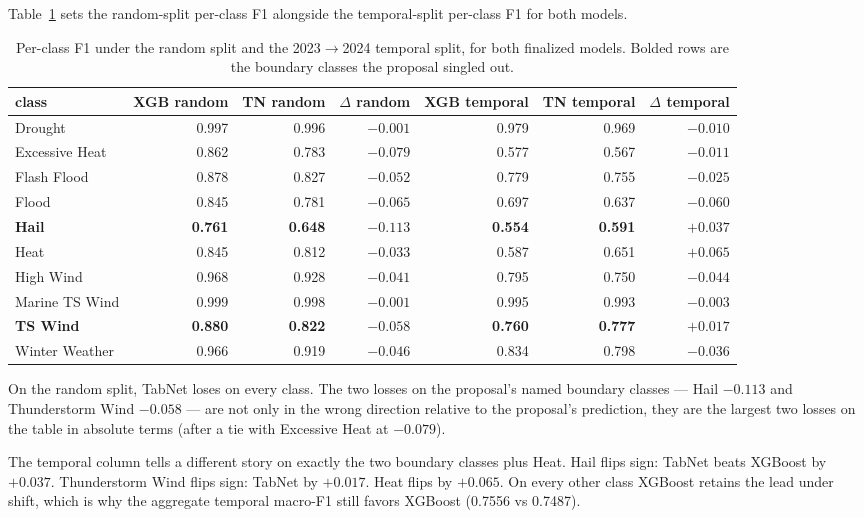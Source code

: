 \documentclass[11pt]{article}
\newcommand{\mF}{macro-F1}
\begin{document}
Table~\ref{tab:per-class} sets the random-split per-class F1
alongside the temporal-split per-class F1 for both models.

\begin{table}[h]
  \centering
  \scriptsize
  \caption{Per-class F1 under the random split and the
  2023$\rightarrow$2024 temporal split, for both finalized models.
  Bolded rows are the boundary classes the proposal singled out.}
  \label{tab:per-class}
  \begin{tabular}{lrrrrrr}
    \toprule
    class & XGB random & TN random & $\Delta$ random & XGB temporal & TN temporal & $\Delta$ temporal \\
    \midrule
    Drought           & 0.997 & 0.996 & $-0.001$ & 0.979 & 0.969 & $-0.010$ \\
    Excessive Heat    & 0.862 & 0.783 & $-0.079$ & 0.577 & 0.567 & $-0.011$ \\
    Flash Flood       & 0.878 & 0.827 & $-0.052$ & 0.779 & 0.755 & $-0.025$ \\
    Flood             & 0.845 & 0.781 & $-0.065$ & 0.697 & 0.637 & $-0.060$ \\
    \textbf{Hail}     & \textbf{0.761} & \textbf{0.648} & \textbf{$-0.113$} & \textbf{0.554} & \textbf{0.591} & \textbf{$+0.037$} \\
    Heat              & 0.845 & 0.812 & $-0.033$ & 0.587 & 0.651 & $+0.065$ \\
    High Wind         & 0.968 & 0.928 & $-0.041$ & 0.795 & 0.750 & $-0.044$ \\
    Marine TS Wind    & 0.999 & 0.998 & $-0.001$ & 0.995 & 0.993 & $-0.003$ \\
    \textbf{TS Wind}  & \textbf{0.880} & \textbf{0.822} & \textbf{$-0.058$} & \textbf{0.760} & \textbf{0.777} & \textbf{$+0.017$} \\
    Winter Weather    & 0.966 & 0.919 & $-0.046$ & 0.834 & 0.798 & $-0.036$ \\
    \bottomrule
  \end{tabular}
\end{table}

On the random split, TabNet loses on every class. The two losses on
the proposal's named boundary classes --- Hail $-0.113$ and
Thunderstorm Wind $-0.058$ --- are not only in the wrong direction
relative to the proposal's prediction, they are the largest two
losses on the table in absolute terms (after a tie with Excessive
Heat at $-0.079$).

The temporal column tells a different story on exactly the two
boundary classes plus Heat. Hail flips sign: TabNet beats XGBoost by
$+0.037$. Thunderstorm Wind flips sign: TabNet by $+0.017$. Heat
flips by $+0.065$. On every other class XGBoost retains the lead
under shift, which is why the aggregate temporal \mF{} still favors
XGBoost (0.7556 vs 0.7487).
\end{document}
